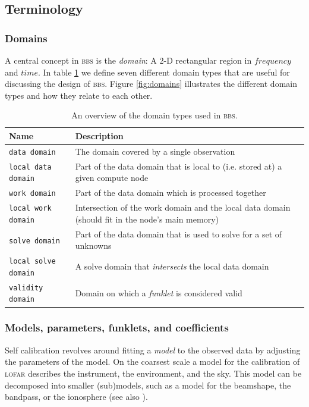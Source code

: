 \documentclass[10pt]{lofar}
\newcommand{\bbs}{\textsc{bbs}\xspace}
\newcommand{\lofar}{\textsc{lofar}\xspace}
\begin{document}
\subsection{Terminology}
\label{subsec:terminology}

\subsubsection{Domains}
\label{subsubsec:domains}
A central concept in \bbs is the \emph{domain}: A 2-D rectangular region in
$frequency$ and $time$. In table \ref{tab:domains} we define seven different
domain types that are useful for discussing the design of \bbs. Figure
\ref{fig:domains} illustrates the different domain types and how they relate to
each other.

\begin{table}[htb!]
\centering
\begin{tabular}{lp{}}
\hline
\textbf{Name} & \textbf{Description}\\
\hline
\texttt{data domain} & The domain covered by a single observation\\
\hline
\texttt{local data domain} & Part of the data domain that is local to (i.e.
stored at) a given compute node\\
\hline
\texttt{work domain} & Part of the data domain which is processed together\\
\hline
\texttt{local work domain} & Intersection of the work domain and the local data
domain (should fit in the node's main memory)\\
\hline
\texttt{solve domain} & Part of the data domain that is used to solve for a set
of unknowns\\
\hline
\texttt{local solve domain} & A solve domain that \emph{intersects} the local
data domain\\
\hline
\texttt{validity domain} & Domain on which a \emph{funklet} is considered
valid\\
\end{tabular}
\caption{An overview of the domain types used in \bbs.}
\label{tab:domains}
\end{table}

\subsubsection{Models, parameters, funklets, and coefficients} 
\label{subsubsec:models-parameters-funklets-coefficients}
Self calibration revolves around fitting a \emph{model} to the observed data by
adjusting the parameters of the model. On the coarsest scale a model for the
calibration of \lofar describes the instrument, the environment, and the sky.
This model can be decomposed into smaller (sub)models, such as a model for the
beamshape, the bandpass, or the ionosphere (see also \cite[sec.
2]{LOFAR-ASTRON-SDD-050}).
\end{document}
